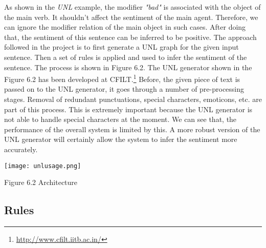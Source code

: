 As shown in the \textit{UNL} example, the modifier \textit{"bad"} is associated with the object of the main verb. It shouldn't affect the sentiment of the main agent. 
Therefore, we can ignore the modifier relation of the main object in such cases. After doing that, the sentiment of this sentence can be inferred to be positive.
The approach followed in the project is to first generate a UNL graph for the given input sentence. Then a set of rules is applied and used to infer the sentiment of the
sentence. The process is shown in Figure 6.2. The UNL generator shown in the Figure 6.2 has been developed at CFILT.\footnote{\url{http://www.cfilt.iitb.ac.in/}} Before, the given piece of text is passed on to the UNL 
generator, it goes through a number of pre-processing stages. Removal of redundant punctuations, special characters, emoticons, etc. are part of this process. This is
extremely important because the UNL generator is not able to handle special characters at the moment. We can see that, the performance of the overall system is limited
by this. A more robust version of the UNL generator will certainly allow the system to infer the sentiment more accurately.
  
\texttt{[image: unlusage.png]} 
\begin{center}
 Figure 6.2 Architecture
\end{center}
  
\subsection*{Rules}

